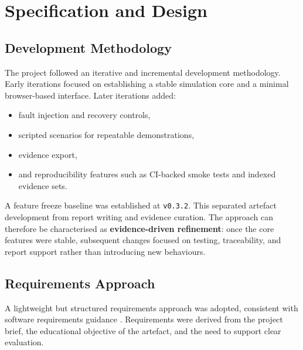 \chapter{Specification and Design}
\label{ch:design}

\section{Development Methodology}
The project followed an iterative and incremental development methodology. Early iterations focused on establishing a stable simulation core and a minimal browser-based interface. Later iterations added:
\begin{itemize}
  \item fault injection and recovery controls,
  \item scripted scenarios for repeatable demonstrations,
  \item evidence export,
  \item and reproducibility features such as CI-backed smoke tests and indexed evidence sets.
\end{itemize}

A feature freeze baseline was established at \texttt{v0.3.2}. This separated artefact development from report writing and evidence curation. The approach can therefore be characterised as \textbf{evidence-driven refinement}: once the core features were stable, subsequent changes focused on testing, traceability, and report support rather than introducing new behaviours.

\section{Requirements Approach}
A lightweight but structured requirements approach was adopted, consistent with software requirements guidance \cite{ieee830_1998}. Requirements were derived from the project brief, the educational objective of the artefact, and the need to support clear evaluation.

